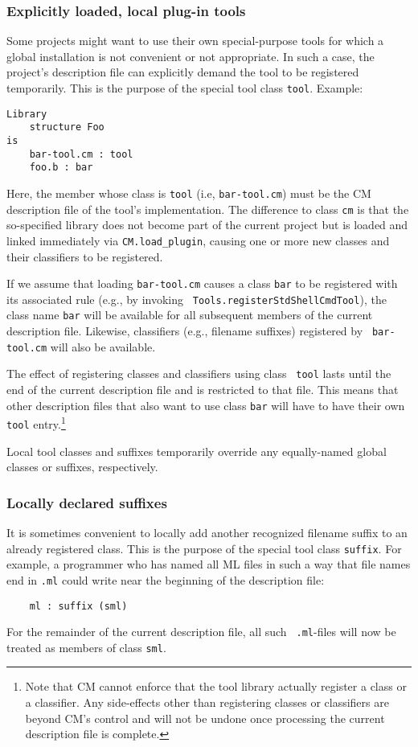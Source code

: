 \subsubsection{Explicitly loaded, local plug-in tools}
\label{sec:localtools}

Some projects might want to use their own special-purpose tools for
which a global installation is not convenient or not appropriate.  In
such a case, the project's description file can explicitly demand the
tool to be registered temporarily.  This is the purpose of the special
tool class {\tt tool}.  Example:

\begin{verbatim}
Library
    structure Foo
is
    bar-tool.cm : tool
    foo.b : bar
\end{verbatim}

Here, the member whose class is {\tt tool} (i.e, {\tt bar-tool.cm})
must be the CM description file of the tool's implementation.  The
difference to class {\tt cm} is that the so-specified library does not
become part of the current project but is loaded and linked
immediately via {\tt CM.load\_plugin}, causing one or more new classes
and their classifiers to be registered.

If we assume that loading {\tt bar-tool.cm} causes a class {\tt bar}
to be registered with its associated rule (e.g., by invoking {\tt
Tools.registerStdShellCmdTool}), the class name {\tt bar} will be
available for all subsequent members of the current description file.
Likewise, classifiers (e.g., filename suffixes) registered by {\tt
bar-tool.cm} will also be available.

The effect of registering classes and classifiers using class {\tt
tool} lasts until the end of the current description file and is
restricted to that file.  This means that other description files that
also want to use class {\tt bar} will have to have their own {\tt
tool} entry.\footnote{Note that CM cannot enforce that the tool
library actually register a class or a classifier.  Any side-effects
other than registering classes or classifiers are beyond CM's control
and will not be undone once processing the current description file is
complete.}

Local tool classes and suffixes temporarily override any equally-named
global classes or suffixes, respectively.

\subsubsection{Locally declared suffixes}
\label{sec:localsuffixes}

It is sometimes convenient to locally add another recognized filename
suffix to an already registered class.  This is the purpose of the
special tool class {\tt suffix}.  For example, a programmer who has
named all ML files in such a way that file names end in {\tt .ml}
could write near the beginning of the description file:

\begin{verbatim}
    ml : suffix (sml)
\end{verbatim}

For the remainder of the current description file, all such {\tt
.ml}-files will now be treated as members of class {\tt sml}.
